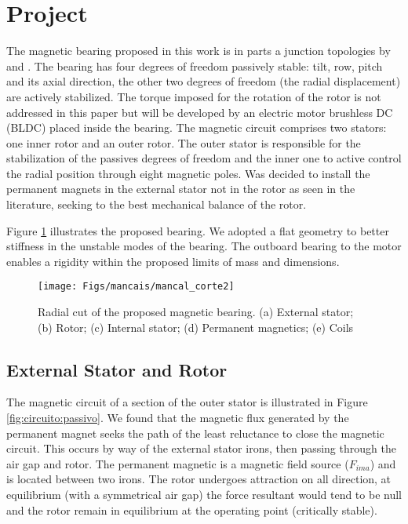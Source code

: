 \documentclass[10pt,fleqn,a4paper,twoside]{article}
\begin{document}
	\section{Project}
	
	The magnetic bearing proposed in this work is in parts a junction topologies by \cite{Bernus1998} and \cite{Scharfe2001}. The bearing has four degrees of freedom passively stable: tilt, row, pitch and its axial direction, the other two degrees of freedom (the radial displacement) are actively stabilized. The torque imposed for the rotation of the rotor is not addressed in this paper but will be developed by an electric motor brushless DC (BLDC) placed inside the bearing. The magnetic circuit comprises two stators: one inner rotor and an outer rotor. The outer stator is responsible for the stabilization of the passives degrees of freedom and the inner one to active control the radial position through eight magnetic poles. Was decided to install the permanent magnets in the external stator not in the rotor as seen in the literature, seeking to the best mechanical balance of the rotor.
	
	Figure \ref{fig:mancal:corte} illustrates the proposed bearing. We adopted a flat geometry to better stiffness in the unstable modes of the bearing. The outboard bearing to the motor enables a rigidity within the proposed limits of mass and dimensions.
	
	\begin{figure}[ht]
		\centering
		\texttt{[image: Figs/mancais/mancal\_corte2]}
		\caption{Radial cut of the proposed magnetic bearing. (a) External stator; (b) Rotor; (c) Internal stator; (d) Permanent magnetics; (e) Coils}
		\label{fig:mancal:corte}
	\end{figure}
	
	\subsection{External Stator and Rotor}
	
	The magnetic circuit of a section of the outer stator is illustrated in Figure \ref{fig:circuito:passivo}. We found that the magnetic flux generated by the permanent magnet seeks the path of the least reluctance to close the magnetic circuit. This occurs by way of the external stator irons, then passing through the air gap and rotor. The permanent magnetic is a magnetic field source ($ F_ {ima} $) and is located between two irons. 
	The rotor undergoes attraction on all direction, at equilibrium (with a symmetrical air gap) the force resultant would tend to be null and the rotor remain in equilibrium at the operating point (critically stable). 
	
\end{document}
